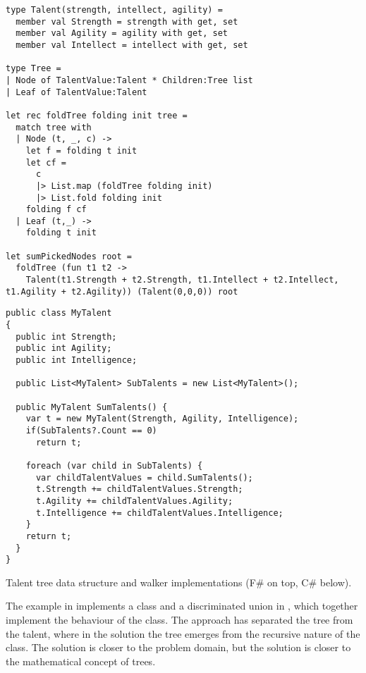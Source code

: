 \begin{listing}[H]
  \begin{verbatim}
type Talent(strength, intellect, agility) =
  member val Strength = strength with get, set
  member val Agility = agility with get, set
  member val Intellect = intellect with get, set

type Tree =
| Node of TalentValue:Talent * Children:Tree list
| Leaf of TalentValue:Talent

let rec foldTree folding init tree =
  match tree with
  | Node (t, _, c) ->
    let f = folding t init
    let cf =
      c
      |> List.map (foldTree folding init)
      |> List.fold folding init
    folding f cf
  | Leaf (t,_) ->
    folding t init

let sumPickedNodes root =
  foldTree (fun t1 t2 ->
    Talent(t1.Strength + t2.Strength, t1.Intellect + t2.Intellect, t1.Agility + t2.Agility)) (Talent(0,0,0)) root
  \end{verbatim}
  \begin{verbatim}
public class MyTalent
{
  public int Strength;
  public int Agility;
  public int Intelligence;

  public List<MyTalent> SubTalents = new List<MyTalent>();

  public MyTalent SumTalents() {
    var t = new MyTalent(Strength, Agility, Intelligence);
    if(SubTalents?.Count == 0)
      return t;

    foreach (var child in SubTalents) {
      var childTalentValues = child.SumTalents();
      t.Strength += childTalentValues.Strength;
      t.Agility += childTalentValues.Agility;
      t.Intelligence += childTalentValues.Intelligence;
    }
    return t;
  }
}
  \end{verbatim}
  \caption{Talent tree data structure and walker implementations (F\# on top, C\# below).}
  \label{lst:tree-imps}
\end{listing}

The example in  implements a class and a discriminated union in \fs, which together implement the behaviour of the \cs class. The \fs approach has separated the tree from the talent, where in the  \cs solution the tree emerges from the recursive nature of the class. The \cs solution is closer to the problem domain, but the \fs solution is closer to the mathematical concept of trees.
